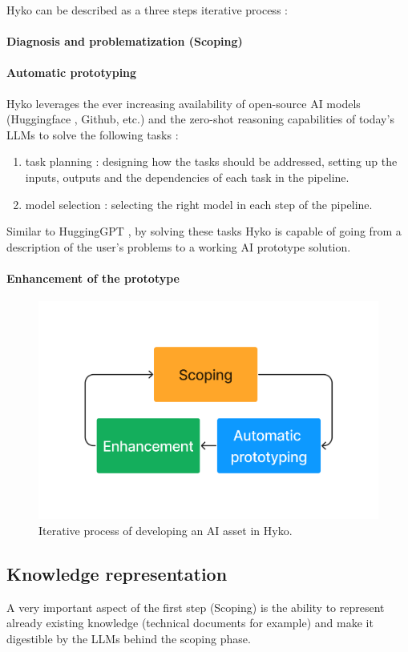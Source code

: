 \documentclass[a4paper,12pt]{article}
\begin{document}
Hyko can be described as a three steps iterative process :

\paragraph{Diagnosis and problematization (Scoping)}

\paragraph{Automatic prototyping}
Hyko leverages the ever increasing availability of open-source AI models (Huggingface \cite{huggingface}, Github, etc.)
and the zero-shot reasoning capabilities \cite{zeroshot} of today's LLMs to solve the following tasks : 

\begin{enumerate}
    \item task planning : designing how the tasks should be addressed, setting up the inputs, outputs and the dependencies of each task in the pipeline.
    \item model selection : selecting the right model in each step of the pipeline.
\end{enumerate}

Similar to HuggingGPT \cite{hugginggpt}, by solving these tasks Hyko is capable of going from a description of the user's problems to a working AI prototype solution.


\paragraph{Enhancement of the prototype}


\begin{figure}[h]
\centering
\includegraphics[width=.5\linewidth]{figures/3process.png}
\caption{Iterative process of developing an AI asset in Hyko.}
\label{fig:hykoprocess}
\end{figure}

\subsection{Knowledge representation}
A very important aspect of the first step (Scoping) is the ability to represent already existing knowledge (technical documents for example) and make it digestible by the LLMs behind the scoping phase.
\end{document}
